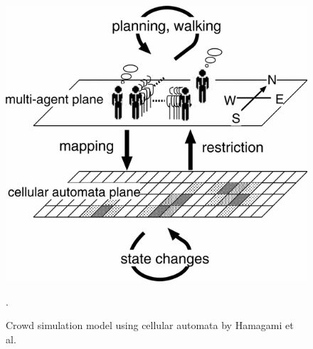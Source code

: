 \documentclass[11pt, a4paper]{book}
\begin{document}
\begin{figure}[h!]
\centering
\includegraphics[width=.6\textwidth]{./cellular_automata_crowd.png}
\caption{Crowd simulation model using cellular automata by Hamagami et al. \cite{1241047}}.
\label{fig:cellularautomata}
\end{figure}

\end{document}
